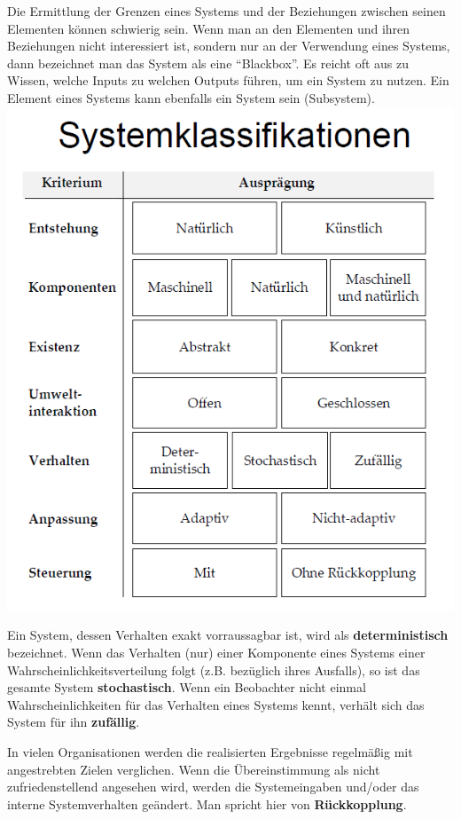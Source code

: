 \documentclass[]{article}
\begin{document}
Die Ermittlung der Grenzen eines Systems und der Beziehungen zwischen
seinen Elementen können schwierig sein. Wenn man an den Elementen und
ihren Beziehungen nicht interessiert ist, sondern nur an der Verwendung
eines Systems, dann bezeichnet man das System als eine ``Blackbox''. Es
reicht oft aus zu Wissen, welche Inputs zu welchen Outputs führen, um
ein System zu nutzen. Ein Element eines Systems kann ebenfalls ein
System sein (Subsystem). \includegraphics{img/systemcl.png}

Ein System, dessen Verhalten exakt vorraussagbar ist, wird als
\textbf{deterministisch} bezeichnet. Wenn das Verhalten (nur) einer
Komponente eines Systems einer Wahrscheinlichkeitsverteilung folgt (z.B.
bezüglich ihres Ausfalls), so ist das gesamte System
\textbf{stochastisch}. Wenn ein Beobachter nicht einmal
Wahrscheinlichkeiten für das Verhalten eines Systems kennt, verhält sich
das System für ihn \textbf{zufällig}.

In vielen Organisationen werden die realisierten Ergebnisse regelmäßig
mit angestrebten Zielen verglichen. Wenn die Übereinstimmung als nicht
zufriedenstellend angesehen wird, werden die Systemeingaben und/oder das
interne Systemverhalten geändert. Man spricht hier von
\textbf{Rückkopplung}.
\end{document}
